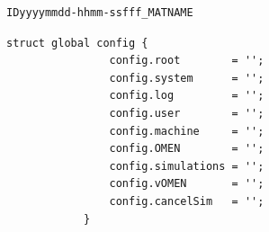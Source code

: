 			\begin{lstlisting}[frame=single]
				IDyyyymmdd-hhmm-ssfff_MATNAME
			\end{lstlisting}
				
			\begin{lstlisting}[frame=single]
			struct global config {
				config.root        = '';
				config.system      = '';
				config.log         = '';
				config.user        = '';
				config.machine     = '';
				config.OMEN        = '';
				config.simulations = '';
				config.vOMEN       = '';
				config.cancelSim   = '';
			}
			\end{lstlisting}
			
%			
%		
%		

